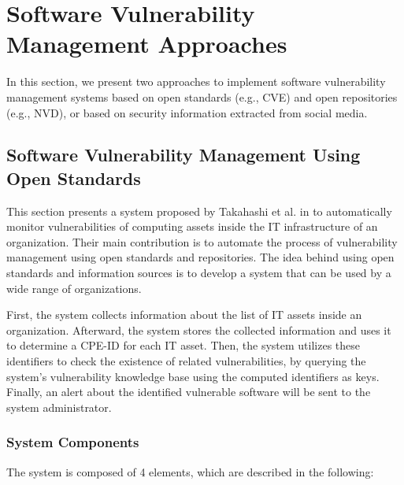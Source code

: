 \documentclass{llncs}
\begin{document}
\section{Software	Vulnerability	Management	Approaches}
 
 In this section, we present two approaches to implement software vulnerability management systems based on  open standards (e.g., CVE) and open repositories (e.g., NVD), or based on  security information extracted from social media.
\subsection{Software	Vulnerability	Management	Using	Open	Standards}

\par This section presents a system proposed by Takahashi et al. in \cite{paper1} to automatically monitor vulnerabilities of computing assets inside the IT infrastructure of an organization. Their main contribution is to automate the process of vulnerability management using open standards and repositories. The idea behind using open standards and information sources is to develop a system that can be used  by a wide range of organizations.
\par
 First, the system collects information about the list of IT assets inside an organization. Afterward, the system stores the collected information and uses it to determine a CPE-ID for each IT asset. Then, the system utilizes these identifiers to check the existence of related vulnerabilities, by querying the system's vulnerability knowledge base using the computed identifiers as keys. Finally, an alert about the identified vulnerable software will be sent to the system administrator.
    
\subsubsection {System Components }

\begin{flushleft}
 The system is composed of 4 elements, which are described in the following:
\end{flushleft}
\end{document}
